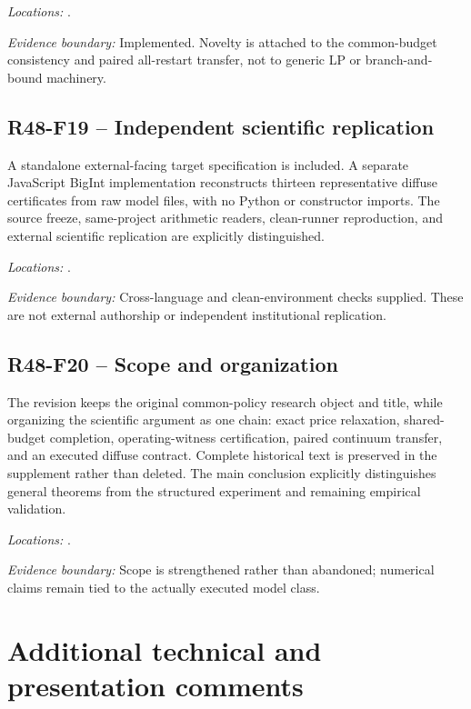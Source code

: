\noindent\emph{Locations:} .

\noindent\emph{Evidence boundary:} Implemented. Novelty is attached to the common-budget consistency and paired all-restart transfer, not to generic LP or branch-and-bound machinery.

\subsection{R48-F19 -- Independent scientific replication}
A standalone external-facing target specification is included. A separate JavaScript BigInt implementation reconstructs thirteen representative diffuse certificates from raw model files, with no Python or constructor imports. The source freeze, same-project arithmetic readers, clean-runner reproduction, and external scientific replication are explicitly distinguished.

\noindent\emph{Locations:} .

\noindent\emph{Evidence boundary:} Cross-language and clean-environment checks supplied. These are not external authorship or independent institutional replication.

\subsection{R48-F20 -- Scope and organization}
The revision keeps the original common-policy research object and title, while organizing the scientific argument as one chain: exact price relaxation, shared-budget completion, operating-witness certification, paired continuum transfer, and an executed diffuse contract. Complete historical text is preserved in the supplement rather than deleted. The main conclusion explicitly distinguishes general theorems from the structured experiment and remaining empirical validation.

\noindent\emph{Locations:} .

\noindent\emph{Evidence boundary:} Scope is strengthened rather than abandoned; numerical claims remain tied to the actually executed model class.

\section{Additional technical and presentation comments}
